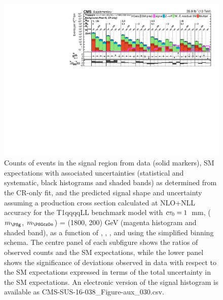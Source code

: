 \begin{figure}[p]
    \begin{center}
        \includegraphics[width=1.00\textwidth]{Supplementary/CMS-SUS-16-038_Figure-aux_030.pdf}
  \caption{Counts of events in the signal region from data (solid markers), SM expectations
    with associated uncertainties (statistical and systematic, black
    histograms and shaded bands) as determined from the CR-only fit,
    and the predicted signal shape and uncertainty assuming a production cross
    section calculated at NLO+NLL accuracy for the
        T1qqqqLL benchmark model with $c\tau_{0}=1$~mm, ($m_{\PSg}$, $m_{\PSGczDo}$) = (1800, 200) GeV
    (magenta histogram and shaded band),
    as a function of \njet, \nb, \scalht, and \mht using the simplified binning schema.
    The centre panel of each subfigure shows the ratios of
    observed counts and the SM expectations, while the lower panel
    shows the significance of deviations observed in data with respect
    to the SM expectations expressed in terms of the total uncertainty
    in the SM expectations.  
	An electronic version of the signal histogram is available as CMS-SUS-16-038\_Figure-aux\_030.csv.
        }
        \label{fig:T1qqqqLL_1_1800_200_MR_sig}
    \end{center}
\end{figure}

